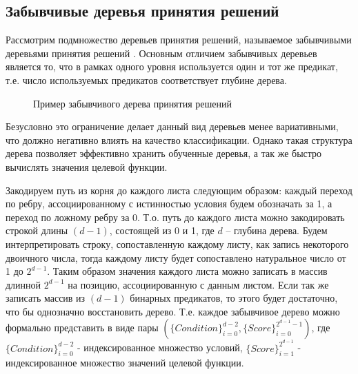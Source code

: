 \documentclass[12pt,a4paper]{report}
\begin{document}
\subsection{Забывчивые деревья принятия решений}
Рассмотрим подмножество деревьев принятия решений, называемое забывчивыми деревьями принятия решений \cite{Ot}.
Основным отличием забывчивых деревьев является то, что 
в рамках одного уровня используется один и тот же предикат, т.е. число используемых предикатов соответствует глубине дерева.


\begin{figure}[H]
\center{\texttt{[image: ot]}}
\caption{Пример забывчивого дерева принятия решений}
\label{ris:ot}
\end{figure}

Безусловно это ограничение делает данный вид деревьев менее вариативными, что должно негативно влиять на качество классификации. Однако такая структура дерева позволяет эффективно хранить обученные деревья, а так же быстро вычислять значения целевой функции.

Закодируем путь из корня до каждого листа следующим образом: каждый переход по ребру, ассоциированному с истинностью условия будем обозначать за 1, а переход по ложному ребру за 0. Т.о. путь до каждого листа можно закодировать строкой длины $(d-1)$, состоящей из 0 и 1, где $d$ -- глубина дерева. Будем интерпретировать строку, сопоставленную каждому листу, как запись некоторого двоичного числа, тогда каждому листу будет сопоставлено натуральное число от 1 до $2^{d-1}$.
Таким образом значения каждого листа можно записать в массив длинной $2^{d-1}$ на позицию, ассоциированную с данным листом. Если так же записать массив из $(d-1)$ бинарных предикатов, то этого будет достаточно, что бы однозначно восстановить дерево.
Т.е. каждое забывчивое дерево можно формально представить в виде пары $(\{Condition\}_{i=0}^{d - 2}, \{Score\}_{i=0}^{2^{d - 1} - 1})$, где $\{Condition\}_{i=0}^{d - 2}$ - индексированное множество условий, $\{Score\}_{i=1}^{2^{d - 1}}$ - индексированное множество значений целевой функции.
\end{document}
